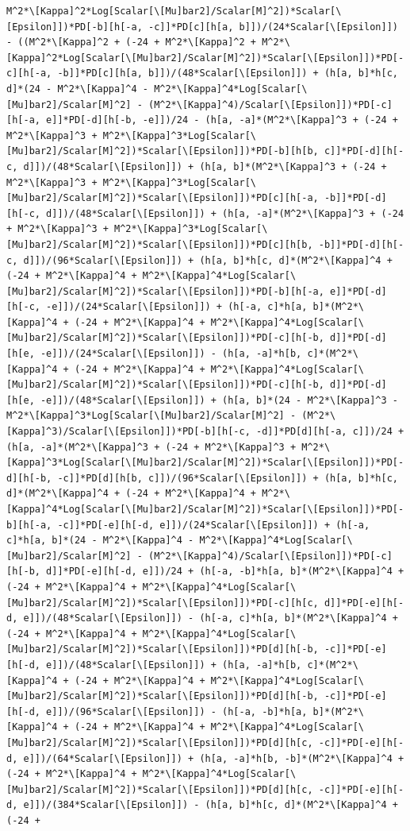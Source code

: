 \documentclass[11pt]{article}
\begin{document}
\begin{verbatim}
M^2*\[Kappa]^2*Log[Scalar[\[Mu]bar2]/Scalar[M]^2])*Scalar[\[Epsilon]])*PD[-b][h[-a, -c]]*PD[c][h[a, b]])/(24*Scalar[\[Epsilon]]) - ((M^2*\[Kappa]^2 + (-24 + M^2*\[Kappa]^2 + M^2*\[Kappa]^2*Log[Scalar[\[Mu]bar2]/Scalar[M]^2])*Scalar[\[Epsilon]])*PD[-c][h[-a, -b]]*PD[c][h[a, b]])/(48*Scalar[\[Epsilon]]) + (h[a, b]*h[c, d]*(24 - M^2*\[Kappa]^4 - M^2*\[Kappa]^4*Log[Scalar[\[Mu]bar2]/Scalar[M]^2] - (M^2*\[Kappa]^4)/Scalar[\[Epsilon]])*PD[-c][h[-a, e]]*PD[-d][h[-b, -e]])/24 - (h[a, -a]*(M^2*\[Kappa]^3 + (-24 + M^2*\[Kappa]^3 + M^2*\[Kappa]^3*Log[Scalar[\[Mu]bar2]/Scalar[M]^2])*Scalar[\[Epsilon]])*PD[-b][h[b, c]]*PD[-d][h[-c, d]])/(48*Scalar[\[Epsilon]]) + (h[a, b]*(M^2*\[Kappa]^3 + (-24 + M^2*\[Kappa]^3 + M^2*\[Kappa]^3*Log[Scalar[\[Mu]bar2]/Scalar[M]^2])*Scalar[\[Epsilon]])*PD[c][h[-a, -b]]*PD[-d][h[-c, d]])/(48*Scalar[\[Epsilon]]) + (h[a, -a]*(M^2*\[Kappa]^3 + (-24 + M^2*\[Kappa]^3 + M^2*\[Kappa]^3*Log[Scalar[\[Mu]bar2]/Scalar[M]^2])*Scalar[\[Epsilon]])*PD[c][h[b, -b]]*PD[-d][h[-c, d]])/(96*Scalar[\[Epsilon]]) + (h[a, b]*h[c, d]*(M^2*\[Kappa]^4 + (-24 + M^2*\[Kappa]^4 + M^2*\[Kappa]^4*Log[Scalar[\[Mu]bar2]/Scalar[M]^2])*Scalar[\[Epsilon]])*PD[-b][h[-a, e]]*PD[-d][h[-c, -e]])/(24*Scalar[\[Epsilon]]) + (h[-a, c]*h[a, b]*(M^2*\[Kappa]^4 + (-24 + M^2*\[Kappa]^4 + M^2*\[Kappa]^4*Log[Scalar[\[Mu]bar2]/Scalar[M]^2])*Scalar[\[Epsilon]])*PD[-c][h[-b, d]]*PD[-d][h[e, -e]])/(24*Scalar[\[Epsilon]]) - (h[a, -a]*h[b, c]*(M^2*\[Kappa]^4 + (-24 + M^2*\[Kappa]^4 + M^2*\[Kappa]^4*Log[Scalar[\[Mu]bar2]/Scalar[M]^2])*Scalar[\[Epsilon]])*PD[-c][h[-b, d]]*PD[-d][h[e, -e]])/(48*Scalar[\[Epsilon]]) + (h[a, b]*(24 - M^2*\[Kappa]^3 - M^2*\[Kappa]^3*Log[Scalar[\[Mu]bar2]/Scalar[M]^2] - (M^2*\[Kappa]^3)/Scalar[\[Epsilon]])*PD[-b][h[-c, -d]]*PD[d][h[-a, c]])/24 + (h[a, -a]*(M^2*\[Kappa]^3 + (-24 + M^2*\[Kappa]^3 + M^2*\[Kappa]^3*Log[Scalar[\[Mu]bar2]/Scalar[M]^2])*Scalar[\[Epsilon]])*PD[-d][h[-b, -c]]*PD[d][h[b, c]])/(96*Scalar[\[Epsilon]]) + (h[a, b]*h[c, d]*(M^2*\[Kappa]^4 + (-24 + M^2*\[Kappa]^4 + M^2*\[Kappa]^4*Log[Scalar[\[Mu]bar2]/Scalar[M]^2])*Scalar[\[Epsilon]])*PD[-b][h[-a, -c]]*PD[-e][h[-d, e]])/(24*Scalar[\[Epsilon]]) + (h[-a, c]*h[a, b]*(24 - M^2*\[Kappa]^4 - M^2*\[Kappa]^4*Log[Scalar[\[Mu]bar2]/Scalar[M]^2] - (M^2*\[Kappa]^4)/Scalar[\[Epsilon]])*PD[-c][h[-b, d]]*PD[-e][h[-d, e]])/24 + (h[-a, -b]*h[a, b]*(M^2*\[Kappa]^4 + (-24 + M^2*\[Kappa]^4 + M^2*\[Kappa]^4*Log[Scalar[\[Mu]bar2]/Scalar[M]^2])*Scalar[\[Epsilon]])*PD[-c][h[c, d]]*PD[-e][h[-d, e]])/(48*Scalar[\[Epsilon]]) - (h[-a, c]*h[a, b]*(M^2*\[Kappa]^4 + (-24 + M^2*\[Kappa]^4 + M^2*\[Kappa]^4*Log[Scalar[\[Mu]bar2]/Scalar[M]^2])*Scalar[\[Epsilon]])*PD[d][h[-b, -c]]*PD[-e][h[-d, e]])/(48*Scalar[\[Epsilon]]) + (h[a, -a]*h[b, c]*(M^2*\[Kappa]^4 + (-24 + M^2*\[Kappa]^4 + M^2*\[Kappa]^4*Log[Scalar[\[Mu]bar2]/Scalar[M]^2])*Scalar[\[Epsilon]])*PD[d][h[-b, -c]]*PD[-e][h[-d, e]])/(96*Scalar[\[Epsilon]]) - (h[-a, -b]*h[a, b]*(M^2*\[Kappa]^4 + (-24 + M^2*\[Kappa]^4 + M^2*\[Kappa]^4*Log[Scalar[\[Mu]bar2]/Scalar[M]^2])*Scalar[\[Epsilon]])*PD[d][h[c, -c]]*PD[-e][h[-d, e]])/(64*Scalar[\[Epsilon]]) + (h[a, -a]*h[b, -b]*(M^2*\[Kappa]^4 + (-24 + M^2*\[Kappa]^4 + M^2*\[Kappa]^4*Log[Scalar[\[Mu]bar2]/Scalar[M]^2])*Scalar[\[Epsilon]])*PD[d][h[c, -c]]*PD[-e][h[-d, e]])/(384*Scalar[\[Epsilon]]) - (h[a, b]*h[c, d]*(M^2*\[Kappa]^4 + (-24 + 
\end{verbatim}
\end{document}
